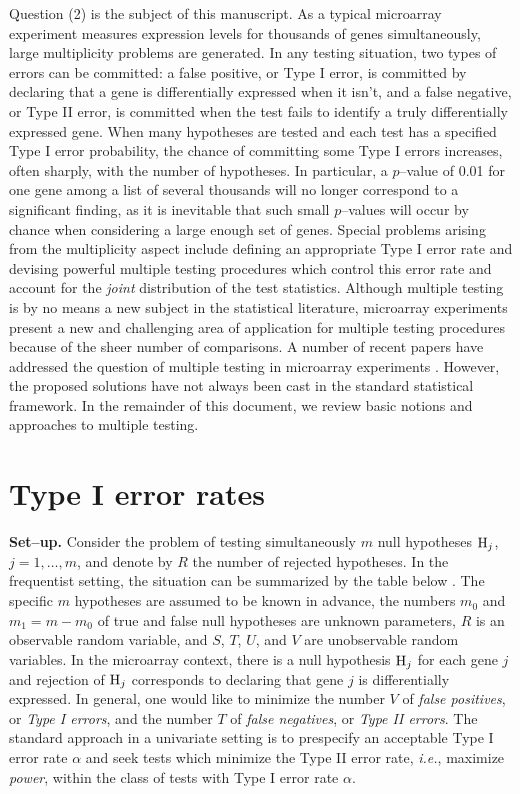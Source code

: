\documentclass[11pt]{article}
\begin{document}
Question (2) is the subject of this manuscript. 
As a typical microarray
experiment measures expression levels for thousands of genes
simultaneously, large multiplicity problems are generated. In any
testing situation, two types of errors can be committed: a false
positive, or Type I error, is committed by declaring that a gene is
differentially expressed when it isn't, and a false negative, or Type
II error, is committed when the test fails to identify a truly
differentially expressed gene. When many hypotheses are tested and
each test has a specified Type I error probability, the chance of
committing some Type I errors increases, often sharply, with the
number of hypotheses. In particular, a $p$--value of 0.01 for one gene among a list
of several thousands will no longer correspond to a significant
finding, as it is inevitable that such small $p$--values will occur by chance when 
considering a large enough set of genes. Special problems arising from the multiplicity
aspect include defining an appropriate Type I error rate and devising
powerful multiple testing procedures which control this error rate and
account for the {\it joint} distribution of the test statistics. 
Although multiple testing is by no means a new subject in the
statistical literature, microarray experiments present a new and
challenging area of application for multiple testing procedures
because of the sheer number of comparisons. A
number of recent papers have addressed the question of multiple
testing in microarray experiments \citep{DudoitetalSinica02,Efronetal01,Golubetal,Manduchietal00,Tusheretal,Westfalletal01}. However, the proposed solutions have not always been cast in the standard statistical framework. In the remainder of this
document, we review basic notions and approaches to multiple testing.


\section{Type I error rates}\label{sTypeI}

{\bf Set--up.} Consider the problem of testing simultaneously $m$ null hypotheses ${\rm H}_j$, $j=1,\ldots,m$, and denote by $R$ the number of rejected hypotheses. In the frequentist setting, the situation can be summarized by the table below \citep{Benjamini&Hochberg95}. The specific $m$ hypotheses are assumed to be known in advance, the
numbers $m_0$ and $m_1 = m-m_0$ of true and false null hypotheses are unknown parameters, $R$ is
an observable random variable, and $S$, $T$, $U$, and $V$ are unobservable random variables. In the microarray context, there is a null hypothesis ${\rm H}_j$ for each gene $j$ and rejection of ${\rm H}_j$ corresponds to declaring that gene $j$ is differentially expressed. In general, one would like to minimize the number $V$ of {\it false positives}, or {\it Type I errors}, and the number $T$ of {\it false negatives}, or {\it Type II errors}. The standard approach in a univariate setting is to prespecify an acceptable Type I error rate $\alpha$ and seek tests which minimize the Type II error rate, {\it i.e.}, maximize {\it power}, within the class of tests with Type I error rate $\alpha$. \\
\end{document}
